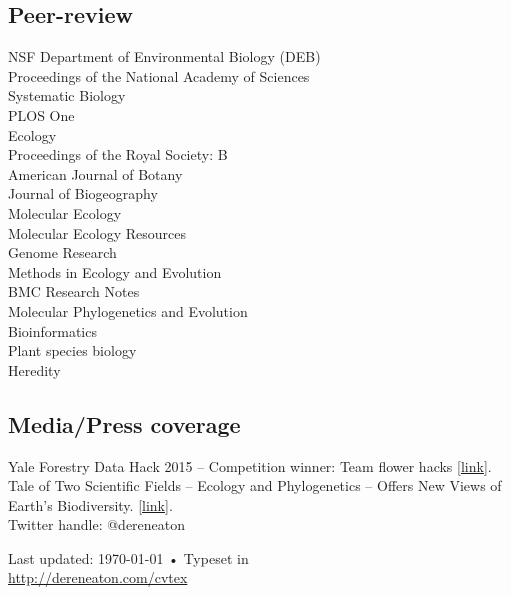 \documentclass[11pt]{article}
\begin{document}
\subsection*{Peer-review}
NSF Department of Environmental Biology (DEB)\\
Proceedings of the National Academy of Sciences\\
Systematic Biology\\
PLOS One\\
Ecology\\
Proceedings of the Royal Society: B\\
American Journal of Botany\\
Journal of Biogeography\\
Molecular Ecology\\
Molecular Ecology Resources\\
Genome Research\\
Methods in Ecology and Evolution\\
BMC Research Notes\\
Molecular Phylogenetics and Evolution\\
Bioinformatics\\
Plant species biology\\
Heredity\\

\subsection*{Media/Press coverage}
Yale Forestry Data Hack 2015 -- Competition winner: Team flower hacks [\href{http://epi.yale.edu/the-metric/visualizing-future}{link}].\\
Tale of Two Scientific Fields -- Ecology and Phylogenetics -- Offers New Views of Earth's Biodiversity. [\href{http://nsf.gov/news/news_summ.jsp?cntn_id=125048}{link}].\\
Twitter handle: @dereneaton\\
\vfill


\begin{center}
{\scriptsize  Last updated: \today\- •\- 
Typeset in \href{http://nitens.org/taraborelli/cvtex}{
\XeTeX }\\
\href{http://dereneaton.com/cvtex}{http://dereneaton.com/cvtex}}
\end{center}
\end{document}
